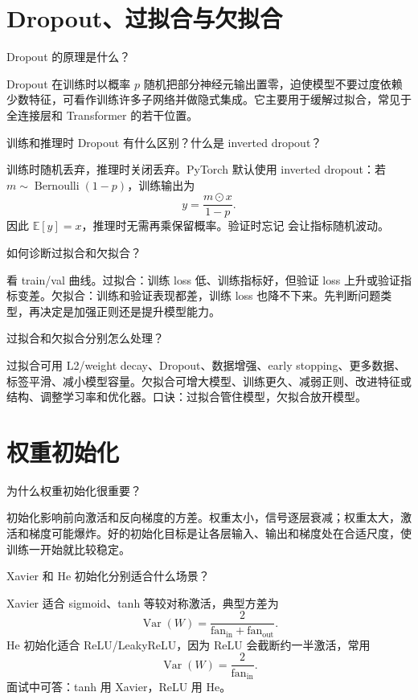 \section{Dropout、过拟合与欠拟合}
\begin{interview}
Dropout 的原理是什么？
\end{interview}
\begin{answer}
Dropout 在训练时以概率 $p$ 随机把部分神经元输出置零，迫使模型不要过度依赖少数特征，可看作训练许多子网络并做隐式集成。它主要用于缓解过拟合，常见于全连接层和 Transformer 的若干位置。
\end{answer}
\begin{interview}
训练和推理时 Dropout 有什么区别？什么是 inverted dropout？
\end{interview}
\begin{answer}
训练时随机丢弃，推理时关闭丢弃。PyTorch 默认使用 inverted dropout：若 $m\sim\operatorname{Bernoulli}(1-p)$，训练输出为
\[
y=\frac{m\odot x}{1-p}.
\]
因此 $\mathbb{E}[y]=x$，推理时无需再乘保留概率。验证时忘记  会让指标随机波动。
\end{answer}
\begin{interview}
如何诊断过拟合和欠拟合？
\end{interview}
\begin{answer}
看 train/val 曲线。过拟合：训练 loss 低、训练指标好，但验证 loss 上升或验证指标变差。欠拟合：训练和验证表现都差，训练 loss 也降不下来。先判断问题类型，再决定是加强正则还是提升模型能力。
\end{answer}
\begin{interview}
过拟合和欠拟合分别怎么处理？
\end{interview}
\begin{answer}
过拟合可用 L2/weight decay、Dropout、数据增强、early stopping、更多数据、标签平滑、减小模型容量。欠拟合可增大模型、训练更久、减弱正则、改进特征或结构、调整学习率和优化器。口诀：过拟合管住模型，欠拟合放开模型。
\end{answer}
\section{权重初始化}
\begin{interview}
为什么权重初始化很重要？
\end{interview}
\begin{answer}
初始化影响前向激活和反向梯度的方差。权重太小，信号逐层衰减；权重太大，激活和梯度可能爆炸。好的初始化目标是让各层输入、输出和梯度处在合适尺度，使训练一开始就比较稳定。
\end{answer}
\begin{interview}
Xavier 和 He 初始化分别适合什么场景？
\end{interview}
\begin{answer}
Xavier 适合 sigmoid、tanh 等较对称激活，典型方差为
\[
\operatorname{Var}(W)=\frac{2}{\mathrm{fan}_{\mathrm{in}}+\mathrm{fan}_{\mathrm{out}}}.
\]
He 初始化适合 ReLU/LeakyReLU，因为 ReLU 会截断约一半激活，常用
\[
\operatorname{Var}(W)=\frac{2}{\mathrm{fan}_{\mathrm{in}}}.
\]
面试中可答：tanh 用 Xavier，ReLU 用 He。
\end{answer}
